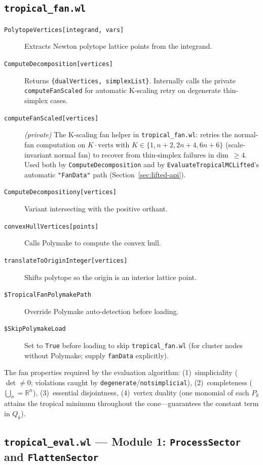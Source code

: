 \documentclass[11pt,a4paper]{article}
\begin{document}
\subsection{\texttt{tropical\_fan.wl}}\label{sec:fan-api}

\begin{description}
  \item[\texttt{PolytopeVertices[integrand, vars]}] Extracts Newton polytope lattice points from the integrand.
  \item[\texttt{ComputeDecomposition[vertices]}] Returns \texttt{\{dualVertices, simplexList\}}. Internally calls the private \texttt{computeFanScaled} for automatic K-scaling retry on degenerate thin-simplex cases.
  \item[\texttt{computeFanScaled[vertices]}] \emph{(private)} The K-scaling fan helper in \texttt{tropical\_fan.wl}: retries the normal-fan computation on $K\!\cdot\!\mathrm{verts}$ with $K\in\{1,n+2,2n+4,6n+6\}$ (scale-invariant normal fan) to recover from thin-simplex failures in dim~$\geq 4$. Used both by \texttt{ComputeDecomposition} and by \texttt{EvaluateTropicalMCLifted}'s automatic \texttt{"FanData"} path (Section~\ref{sec:lifted-api}).
  \item[\texttt{ComputeDecompositiony[vertices]}] Variant intersecting with the positive orthant.
  \item[\texttt{convexHullVertices[points]}] Calls Polymake to compute the convex hull.
  \item[\texttt{translateToOriginInteger[vertices]}] Shifts polytope so the origin is an interior lattice point.
  \item[\texttt{\$TropicalFanPolymakePath}] Override Polymake auto-detection before loading.
  \item[\texttt{\$SkipPolymakeLoad}] Set to \texttt{True} before loading to skip \texttt{tropical\_fan.wl} (for cluster nodes without Polymake; supply \texttt{fanData} explicitly).
\end{description}

The fan properties required by the evaluation algorithm: (1)~simpliciality ($\det\neq 0$; violations caught by \texttt{degenerate}/\texttt{notsimplicial}), (2)~completeness ($\bigcup_\sigma=\mathbb{R}^n$), (3)~essential disjointness, (4)~vertex duality (one monomial of each $P_k$ attains the tropical minimum throughout the cone---guarantees the constant term in $Q_k$).

\subsection{\texttt{tropical\_eval.wl} --- Module 1: \texttt{ProcessSector} and \texttt{FlattenSector}}
\end{document}
